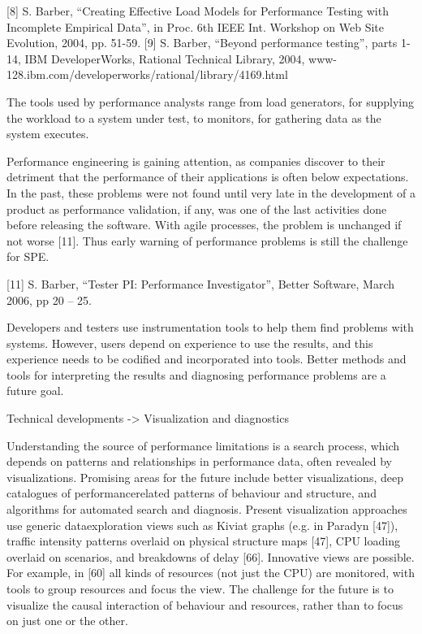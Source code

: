 \documentclass[runningheads,a4paper]{llncs}
\begin{document}
[8] S. Barber, “Creating Effective Load Models for
Performance Testing with Incomplete Empirical Data”, in
Proc. 6th IEEE Int. Workshop on Web Site Evolution, 2004,
pp. 51-59.
[9] S. Barber, “Beyond performance testing”, parts 1-14,
IBM DeveloperWorks, Rational Technical Library, 2004,
www-128.ibm.com/developerworks/rational/library/4169.html

The tools used by performance analysts range from
load generators, for supplying the workload to a
system under test, to monitors, for gathering data as the
system executes.

Performance engineering is gaining attention, as
companies discover to their detriment that the
performance of their applications is often below
expectations. In the past, these problems were not
found until very late in the development of a product as
performance validation, if any, was one of the last
activities done before releasing the software. With
agile processes, the problem is unchanged if not worse
[11]. Thus early warning of performance problems is
still the challenge for SPE.

[11] S. Barber, “Tester PI: Performance Investigator”,
Better Software, March 2006, pp 20 – 25.

Developers and testers use instrumentation tools to
help them find problems with systems. However, users
depend on experience to use the results, and this
experience needs to be codified and incorporated into
tools. Better methods and tools for interpreting the
results and diagnosing performance problems are a
future goal.

Technical developments -> Visualization and diagnostics

Understanding the source of performance limitations
is a search process, which depends on patterns and
relationships in performance data, often revealed by
visualizations. Promising areas for the future include
better visualizations, deep catalogues of performancerelated
patterns of behaviour and structure, and
algorithms for automated search and diagnosis.
Present visualization approaches use generic dataexploration
views such as Kiviat graphs (e.g. in
Paradyn [47]), traffic intensity patterns overlaid on
physical structure maps [47], CPU loading overlaid on
scenarios, and breakdowns of delay [66]. Innovative
views are possible. For example, in [60] all kinds of
resources (not just the CPU) are monitored, with tools
to group resources and focus the view. The challenge
for the future is to visualize the causal interaction of
behaviour and resources, rather than to focus on just
one or the other.
\end{document}
